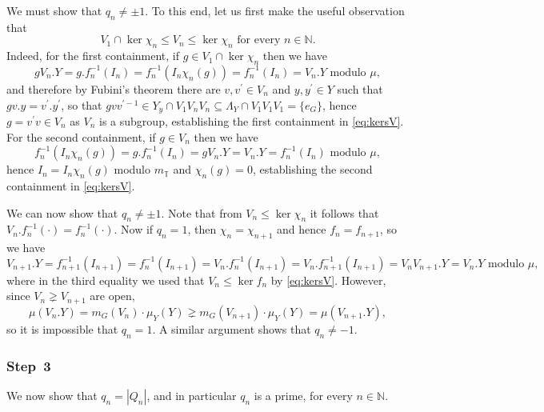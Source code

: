 \documentclass{amsart}
\numberwithin{equation}{subsection}
\theoremstyle{remark}
\begin{document}
We must show that \(q_{n}\neq\pm 1\). To this end, let us first make the useful observation that
\begin{equation}\label{eq:kersV}
V_{1}\cap\ker\chi_{n}\leq V_{n}\leq\ker\chi_{n}\text{ for every }n\in\mathbb{N}.
\end{equation}
Indeed, for the first containment, if \(g\in V_{1}\cap\ker\chi_{n}\) then we have
\[gV_{n}.Y=g.f_{n}^{-1}\left(I_{n}\right)=f_{n}^{-1}\left(I_{n}\chi_{n}\left(g\right)\right)=f_{n}^{-1}\left(I_{n}\right)=V_{n}.Y\text{ modulo }\mu,\]
and therefore by Fubini's theorem there are \(v,v^{\prime}\in V_{n}\) and \(y,y^{\prime}\in Y\) such that \(gv.y=v^{\prime}.y^{\prime}\), so that \(gvv^{\prime -1}\in Y_{y}\cap V_{1}V_{n}V_{n}\subseteq\Lambda_{Y}\cap V_{1}V_{1}V_{1}=\{e_{G}\}\), hence \(g=v^{\prime}v\in V_{n}\) as \(V_{n}\) is a subgroup, establishing the first containment in \eqref{eq:kersV}. For the second containment, if \(g\in V_{n}\) then we have
\[f_{n}^{-1}\left(I_{n}\chi_{n}\left(g\right)\right)=g.f_{n}^{-1}\left(I_{n}\right)=gV_{n}.Y=V_{n}.Y=f_{n}^{-1}\left(I_{n}\right)\text{ modulo }\mu,\]
hence \(I_{n}=I_{n}\chi_{n}\left(g\right)\) modulo \(m_{\mathbb{T}}\) and \(\chi_{n}\left(g\right)=0\), establishing the second containment in \eqref{eq:kersV}.

We can now show that \(q_{n}\neq\pm 1\). Note that from \(V_{n}\leq\ker\chi_{n}\) it follows that \(V_{n}.f_{n}^{-1}\left(\cdot\right)=f_{n}^{-1}\left(\cdot\right)\). Now if \(q_{n}=1\), then \(\chi_{n}=\chi_{n+1}\) and hence \(f_{n}=f_{n+1}\), so we have
\[V_{n+1}.Y=f_{n+1}^{-1}\left(I_{n+1}\right)=f_{n}^{-1}\left(I_{n+1}\right)=V_{n}.f_{n}^{-1}\left(I_{n+1}\right)=V_{n}.f_{n+1}^{-1}\left(I_{n+1}\right)=V_{n}V_{n+1}.Y=V_{n}.Y\text{ modulo }\mu,\]
where in the third equality we used that \(V_{n}\leq\ker f_{n}\) by \eqref{eq:kersV}. However, since \(V_n\gneq V_{n+1}\) are open,
\[\mu\left(V_{n}.Y\right)=m_{G}\left(V_{n}\right)\cdot\mu_{Y}\left(Y\right)\gneq m_{G}\left(V_{n+1}\right)\cdot\mu_{Y}\left(Y\right)=\mu\left(V_{n+1}.Y\right),\]
so it is impossible that \(q_{n}=1\). A similar argument shows that \(q_{n}\neq -1\).

\subsubsection*{\textbf{Step~3}}

We now show that \(q_{n}=\left|Q_{n}\right|\), and in particular \(q_{n}\) is a prime, for every \(n\in\mathbb{N}\).

\smallskip
\end{document}
